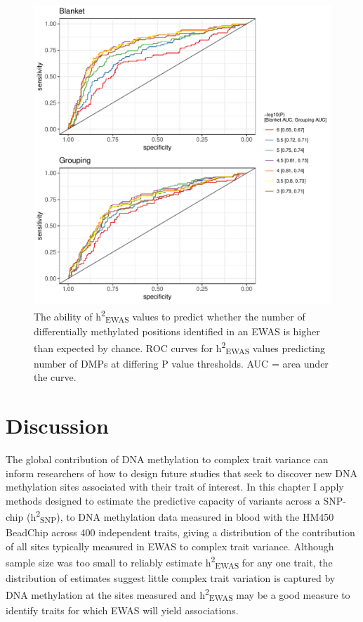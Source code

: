 \documentclass[11pt,oneside]{bristolthesis}
\begin{document}
\begin{figure}

{\centering \includegraphics[width=1\linewidth]{figure/05-h2ewas/roc_plot} 

}

\caption{The ability of h\textsuperscript{2}\textsubscript{EWAS} values to predict whether the number of differentially methylated positions identified in an EWAS is higher than expected by chance. ROC curves for h\textsuperscript{2}\textsubscript{EWAS} values predicting number of DMPs at differing P value thresholds. AUC = area under the curve.}\label{fig:h2ewas-dmp-roc-curve}
\end{figure}
\hypertarget{discussion-05}{%
\section{Discussion}\label{discussion-05}}

The global contribution of DNA methylation to complex trait variance can inform researchers of how to design future studies that seek to discover new DNA methylation sites associated with their trait of interest. In this chapter I apply methods designed to estimate the predictive capacity of variants across a SNP-chip (h\textsuperscript{2}\textsubscript{SNP}), to DNA methylation data measured in blood with the HM450 BeadChip across 400 independent traits, giving a distribution of the contribution of all sites typically measured in EWAS to complex trait variance. Although sample size was too small to reliably estimate h\textsuperscript{2}\textsubscript{EWAS} for any one trait, the distribution of estimates suggest little complex trait variation is captured by DNA methylation at the sites measured and h\textsuperscript{2}\textsubscript{EWAS} may be a good measure to identify traits for which EWAS will yield associations.
\end{document}
